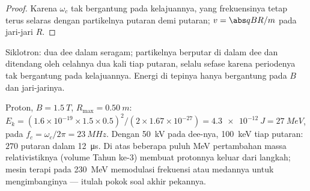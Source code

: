 \begin{proof}
Karena $\omega_c$ tak bergantung pada kelajuannya,  yang frekuensinya
tetap terus selaras dengan partikelnya putaran demi putaran; $v = \abs qBR/m$ pada
jari-jari $R$.
\end{proof}

\begin{omfigure}

{\small Siklotron: dua dee dalam  seragam; partikelnya
berputar di dalam dee dan ditendang oleh  celahnya dua kali tiap
putaran, selalu sefase karena periodenya tak bergantung pada
kelajuannya. Energi di tepinya hanya bergantung pada $B$ dan jari-jarinya.}
\end{omfigure}

\begin{example}\label{ex:b1:charged-particles:medical}
Proton, $B = \qty{1.5}{T}$, $R_{\max} = \qty{0.50}{m}$: $E_k =
(1.6\times10^{-19} \times 1.5 \times 0.5)^2/(2 \times 1.67\times10^{-27}) =
\qty{4.3e-12}{J} = \qty{27}{MeV}$, pada $f_c = \omega_c/2\pi = \qty{23}{MHz}$.
Dengan \qty{50}{kV} pada dee-nya, \qty{100}{keV} tiap putaran: $270$ putaran dalam
\qty{12}{\micro s}. Di atas beberapa puluh MeV pertambahan massa
relativistiknya (volume Tahun ke-3) membuat protonnya keluar dari langkah;
mesin terapi pada \qty{230}{MeV} memodulasi frekuensi atau medannya untuk
mengimbanginya --- itulah pokok soal akhir pekannya.
\end{example}

